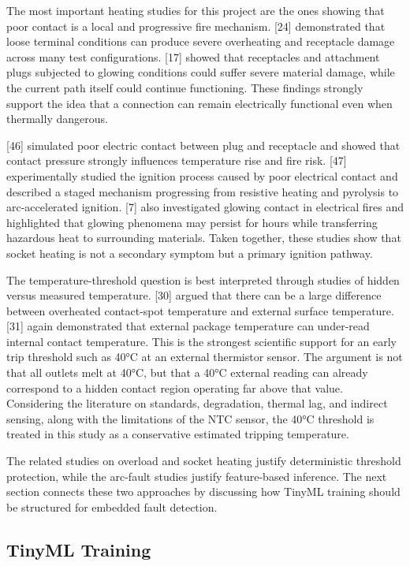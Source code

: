 The most important heating studies for this project are the ones showing
that poor contact is a local and progressive fire mechanism. {[}24{]}
demonstrated that loose terminal conditions can produce severe
overheating and receptacle damage across many test configurations.
{[}17{]} showed that receptacles and attachment plugs subjected to
glowing conditions could suffer severe material damage, while the
current path itself could continue functioning. These findings strongly
support the idea that a connection can remain electrically functional
even when thermally dangerous.

{[}46{]} simulated poor electric contact between plug and receptacle and
showed that contact pressure strongly influences temperature rise and
fire risk. {[}47{]} experimentally studied the ignition process caused
by poor electrical contact and described a staged mechanism progressing
from resistive heating and pyrolysis to arc-accelerated ignition.
{[}7{]} also investigated glowing contact in electrical fires and
highlighted that glowing phenomena may persist for hours while
transferring hazardous heat to surrounding materials. Taken together,
these studies show that socket heating is not a secondary symptom but a
primary ignition pathway.

The temperature-threshold question is best interpreted through studies
of hidden versus measured temperature. {[}30{]} argued that there can be
a large difference between overheated contact-spot temperature and
external surface temperature. {[}31{]} again demonstrated that external
package temperature can under-read internal contact temperature. This is
the strongest scientific support for an early trip threshold such as
40°C at an external thermistor sensor. The argument is not that all outlets
melt at 40°C, but that a 40°C external reading can already correspond to
a hidden contact region operating far above that value. Considering the
literature on standards, degradation, thermal lag, and indirect sensing,
along with the limitations of the NTC sensor, the 40°C threshold is
treated in this study as a conservative estimated tripping temperature.

The related studies on overload and socket heating justify deterministic
threshold protection, while the arc-fault studies justify feature-based
inference. The next section connects these two approaches by discussing
how TinyML training should be structured for embedded fault detection.

\subsection{TinyML Training}\label{tinyml-training}

